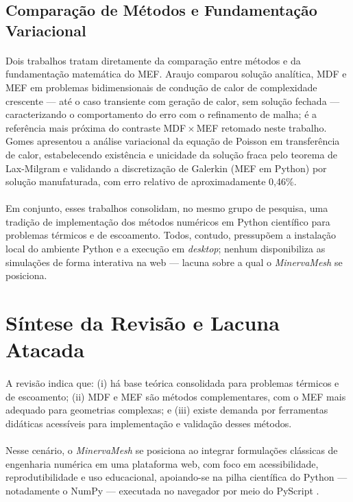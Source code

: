 \subsection{Comparação de Métodos e Fundamentação Variacional}

\paragraph{}Dois trabalhos tratam diretamente da comparação entre métodos e da fundamentação matemática do MEF. Araujo \cite{Araujo2022} comparou solução analítica, MDF e MEF em problemas bidimensionais de condução de calor de complexidade crescente --- até o caso transiente com geração de calor, sem solução fechada --- caracterizando o comportamento do erro com o refinamento de malha; é a referência mais próxima do contraste MDF\,$\times$\,MEF retomado neste trabalho. Gomes \cite{GomesYuri2025} apresentou a análise variacional da equação de Poisson em transferência de calor, estabelecendo existência e unicidade da solução fraca pelo teorema de Lax-Milgram e validando a discretização de Galerkin (MEF em Python) por solução manufaturada, com erro relativo de aproximadamente 0,46\%.

\paragraph{}Em conjunto, esses trabalhos consolidam, no mesmo grupo de pesquisa, uma tradição de implementação dos métodos numéricos em Python científico para problemas térmicos e de escoamento. Todos, contudo, pressupõem a instalação local do ambiente Python e a execução em \textit{desktop}; nenhum disponibiliza as simulações de forma interativa na web --- lacuna sobre a qual o \textit{MinervaMesh} se posiciona.

\section{Síntese da Revisão e Lacuna Atacada}

\paragraph{}A revisão indica que: (i) há base teórica consolidada para problemas térmicos e de escoamento; (ii) MDF e MEF são métodos complementares, com o MEF mais adequado para geometrias complexas; e (iii) existe demanda por ferramentas didáticas acessíveis para implementação e validação desses métodos.

\paragraph{}Nesse cenário, o \textit{MinervaMesh} se posiciona ao integrar formulações clássicas de engenharia numérica em uma plataforma web, com foco em acessibilidade, reprodutibilidade e uso educacional, apoiando-se na pilha científica do Python --- notadamente o NumPy \cite{Harris2020} --- executada no navegador por meio do PyScript \cite{PyScript2023}.
